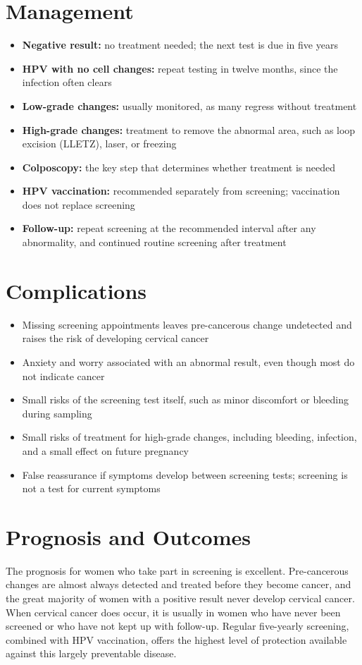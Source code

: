 \section*{Management}
\begin{itemize}
    \item \textbf{Negative result:} no treatment needed; the next test is due in five years
    \item \textbf{HPV with no cell changes:} repeat testing in twelve months, since the infection often clears
    \item \textbf{Low-grade changes:} usually monitored, as many regress without treatment
    \item \textbf{High-grade changes:} treatment to remove the abnormal area, such as loop excision (LLETZ), laser, or freezing
    \item \textbf{Colposcopy:} the key step that determines whether treatment is needed
    \item \textbf{HPV vaccination:} recommended separately from screening; vaccination does not replace screening
    \item \textbf{Follow-up:} repeat screening at the recommended interval after any abnormality, and continued routine screening after treatment
\end{itemize}

\section*{Complications}
\begin{itemize}
    \item Missing screening appointments leaves pre-cancerous change undetected and raises the risk of developing cervical cancer
    \item Anxiety and worry associated with an abnormal result, even though most do not indicate cancer
    \item Small risks of the screening test itself, such as minor discomfort or bleeding during sampling
    \item Small risks of treatment for high-grade changes, including bleeding, infection, and a small effect on future pregnancy
    \item False reassurance if symptoms develop between screening tests; screening is not a test for current symptoms
\end{itemize}

\section*{Prognosis and Outcomes}
The prognosis for women who take part in screening is excellent. Pre-cancerous changes are almost always detected and treated before they become cancer, and the great majority of women with a positive result never develop cervical cancer. When cervical cancer does occur, it is usually in women who have never been screened or who have not kept up with follow-up. Regular five-yearly screening, combined with HPV vaccination, offers the highest level of protection available against this largely preventable disease.

